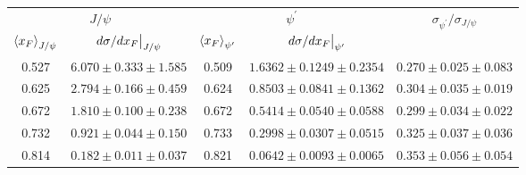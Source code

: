 \begin{tabular}{cc|cc|c}
\hline
\multicolumn{2}{c|}{$J/\psi$}                               & \multicolumn{2}{c|}{$\psi^{\prime}$}                                                    & \multirow{2}{*}{$\sigma_{\psi^\prime}/\sigma_{J/\psi}$} \\ \cline{1-4}
$\expval{x_F}_{J/\psi}$    & $\eval{d\sigma/dx_F}_{J/\psi}$ & $\expval{x_F}_{\psi^\prime}$ & $\eval{d\sigma/dx_F}_{\psi^\prime}$ &                                                         \\ \hline
\multicolumn{1}{c|}{0.527} & $6.070\pm0.333\pm1.585$        & \multicolumn{1}{c|}{0.509}                        & $1.6362\pm0.1249\pm0.2354$          & $0.270\pm0.025\pm0.083$                                 \\
\multicolumn{1}{c|}{0.625} & $2.794\pm0.166\pm0.459$        & \multicolumn{1}{c|}{0.624}                        & $0.8503\pm0.0841\pm0.1362$          & $0.304\pm0.035\pm0.019$                                 \\
\multicolumn{1}{c|}{0.672} & $1.810\pm0.100\pm0.238$        & \multicolumn{1}{c|}{0.672}                        & $0.5414\pm0.0540\pm0.0588$          & $0.299\pm0.034\pm0.022$                                 \\
\multicolumn{1}{c|}{0.732} & $0.921\pm0.044\pm0.150$        & \multicolumn{1}{c|}{0.733}                        & $0.2998\pm0.0307\pm0.0515$          & $0.325\pm0.037\pm0.036$                                 \\
\multicolumn{1}{c|}{0.814} & $0.182\pm0.011\pm0.037$        & \multicolumn{1}{c|}{0.821}                        & $0.0642\pm0.0093\pm0.0065$          & $0.353\pm0.056\pm0.054$                                 \\ \hline
\end{tabular}
